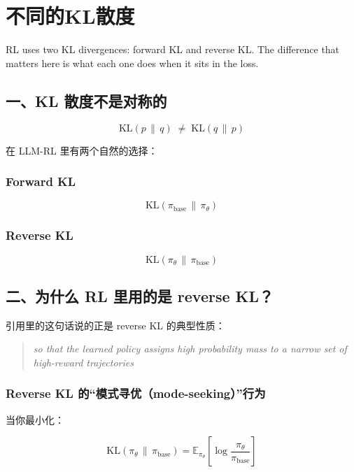 \section{不同的KL散度}

RL uses two KL divergences: forward KL and reverse KL. The difference that matters here is what each one does when it sits in the loss.

\subsection{一、KL 散度不是对称的}

\[
\mathrm{KL}(p \,\|\, q) \;\neq\; \mathrm{KL}(q \,\|\, p)
\]

在 LLM-RL 里有两个自然的选择：

\subsubsection{Forward KL}

\[
\mathrm{KL}(\pi_{\text{base}} \,\|\, \pi_\theta)
\]

\subsubsection{Reverse KL}

\[
\mathrm{KL}(\pi_\theta \,\|\, \pi_{\text{base}})
\]

\subsection{二、为什么 RL 里用的是 reverse KL？}

引用里的这句话说的正是 reverse KL 的典型性质：

\begin{quote}
\emph{so that the learned policy assigns high probability mass to a narrow set of high-reward trajectories}
\end{quote}

\subsubsection{Reverse KL 的“模式寻优（mode-seeking）”行为}

当你最小化：

\[
\mathrm{KL}(\pi_\theta \,\|\, \pi_{\text{base}}) = \mathbb{E}_{\pi_\theta}\left[\log \frac{\pi_\theta}{\pi_{\text{base}}}\right]
\]

